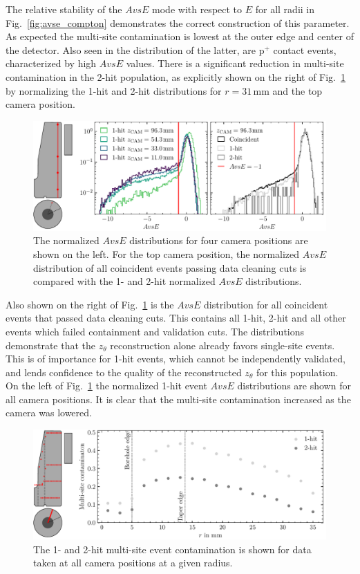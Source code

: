 The relative stability of the $AvsE$ mode with respect to $E$ for all radii in Fig.~\ref{fig:avse_compton} demonstrates the correct construction of this parameter. As expected the multi-site contamination is lowest at the outer edge and center of the detector. Also seen in the distribution of the latter, are p$^+$ contact events, characterized by high $AvsE$ values. There is a significant reduction in multi-site contamination in the 2-hit population, as explicitly shown on the right of Fig.~\ref{fig:avse_cam_z} by normalizing the 1-hit and 2-hit distributions for $r = 31$\,mm and the top camera position. 
\begin{figure}[htb]
    \centering
    \includegraphics[width=6in]{figs/pipeline/avse_cam_z.pdf}
    \caption{The normalized $AvsE$ distributions for four camera positions are shown on the left. For the top camera position, the normalized $AvsE$ distribution of all coincident events passing data cleaning cuts is compared with the 1- and 2-hit normalized $AvsE$ distributions.}
    \label{fig:avse_cam_z}
\end{figure}
Also shown on the right of Fig.~\ref{fig:avse_cam_z} is the $AvsE$ distribution for all coincident events that passed data cleaning cuts. This contains all 1-hit, 2-hit and all other events which failed containment and validation cuts. The distributions demonstrate that the $z_\theta$ reconstruction alone already favors single-site events. This is of importance for 1-hit events, which cannot be independently validated, and lends confidence to the quality of the reconstructed $z_\theta$ for this population. On the left of Fig.~\ref{fig:avse_cam_z} the normalized 1-hit event $AvsE$ distributions are shown for all camera positions. It is clear that the multi-site contamination increased as the camera was lowered. 
\begin{figure}[htb]
    \centering
    \includegraphics[width=6in]{figs/pipeline/multisite_contamination.pdf}
    \caption{The 1- and 2-hit multi-site event contamination is shown for data taken at all camera positions at a given radius.}
    \label{fig:multisite_contamination}
\end{figure}

